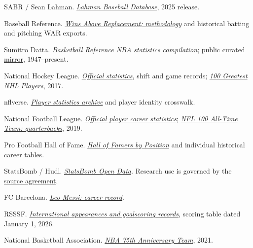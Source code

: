 \documentclass[11pt,letterpaper]{article}
\newcommand{\src}[2]{\href{#1}{#2}}
\begin{document}
\renewcommand{\refname}{Bibliography}
\begin{thebibliography}{99}
\small
\setlength{\itemsep}{3pt}
\setlength{\parskip}{0pt}

SABR / Sean Lahman. \src{https://sabr.org/lahman-database/}{\emph{Lahman Baseball Database}}, 2025 release.

Baseball Reference. \src{https://www.baseball-reference.com/about/war_explained.shtml}{\emph{Wins Above Replacement: methodology}} and historical batting and pitching WAR exports.

Sumitro Datta. \emph{Basketball Reference NBA statistics compilation}; \src{https://github.com/cmuchina3/nba-stats-1947-present-curated}{public curated mirror}, 1947--present.

National Hockey League. \src{https://www.nhl.com/stats/}{\emph{Official statistics}}, shift and game records; \src{https://www.nhl.com/news/100-greatest-nhl-players-complete-list-286199184}{\emph{100 Greatest NHL Players}}, 2017.

nflverse. \src{https://github.com/nflverse/nflverse-data/releases/tag/stats_player}{\emph{Player statistics archive}} and player identity crosswalk.

National Football League. \src{https://www.nfl.com/players/tom-brady/stats/career}{\emph{Official player career statistics}}; \src{https://www.nfl.com/news/nfl-100-all-time-team-quarterbacks-announced-0ap3000001091949}{\emph{NFL 100 All-Time Team: quarterbacks}}, 2019.

Pro Football Hall of Fame. \src{https://www.profootballhof.com/hall-of-famers/positions}{\emph{Hall of Famers by Position}} and individual historical career tables.

StatsBomb / Hudl. \src{https://github.com/hudl/open-data}{\emph{StatsBomb Open Data}}. Research use is governed by the \src{https://github.com/hudl/open-data/blob/master/LICENSE.pdf}{source agreement}.

FC Barcelona. \src{https://www.fcbarcelona.com/en/card/2214377/leo-messi}{\emph{Leo Messi: career record}}.

RSSSF. \src{https://www.rsssf.org/miscellaneous/century.html}{\emph{International appearances and goalscoring records}}, scoring table dated January 1, 2026.

National Basketball Association. \src{https://www.nba.com/news/nba-75th-anniversary-team-announced}{\emph{NBA 75th Anniversary Team}}, 2021.


\end{thebibliography}
\end{document}
